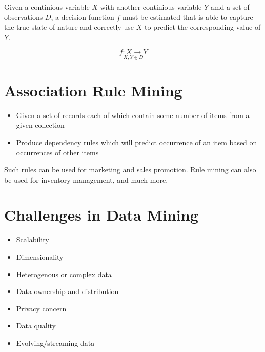 Given a continious variable $X$ with another continious variable $Y$ 
amd a set of observations $D$, a decision function $f$ must be estimated 
that is able to capture the true state of nature and correctly use $X$ to 
predict the corresponding value of $Y$.  

\begin{equation*}
    \underset{X,Y \in D}{f: X \rightarrow Y}
\end{equation*}

\section{Association Rule Mining}
\begin{itemize}
    \item Given a set of records each of which contain some number of items from a given collection
    \item Produce dependency rules which will predict occurrence of an item based on occurrences of other items
\end{itemize}
Such rules can be used for marketing and sales promotion. Rule mining can also be used for inventory management, and much more.

\section{Challenges in Data Mining}
\begin{itemize}
    \item Scalability
    \item Dimensionality
    \item Heterogenous or complex data
    \item Data ownership and distribution
    \item Privacy concern
    \item Data quality
    \item Evolving/streaming data
\end{itemize}
